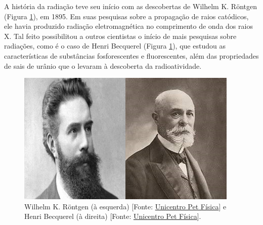 \newcommand{\artigotres}{\begin{center}\textcolor{base}{\MakeUppercase{Tipos de radiações}}\end{center}}


\begin{multicols}{2}


A história da radiação teve seu início com as descobertas de Wilhelm K. Röntgen (Figura \ref{fig:RontgenBecquerel}), em 1895. Em suas pesquisas sobre a propagação de raios catódicos, ele havia produzido radiação eletromagnética no comprimento de onda dos raios X. Tal feito possibilitou a outros cientistas o início de mais pesquisas sobre radiações, como é o caso de Henri Becquerel (Figura \ref{fig:RontgenBecquerel}), que estudou as características de substâncias fosforescentes e fluorescentes, além das propriedades de sais de urânio que o levaram à descoberta da radioatividade.

\begin{figure}[H]
			\centering
			\includegraphics[width=\linewidth]{Figuras/Artigo3/Rontgen_e_Becquerel.png}
			\caption{Wilhelm K. Röntgen (à esquerda) [Fonte: \href{https://www3.unicentro.br/petfisica/2018/03/02/wilhelm-conrad-rontgen-1845-1923/}{Unicentro Pet Física}] e Henri Becquerel (à direita) [Fonte: \href{https://www3.unicentro.br/petfisica/2017/06/22/antoine-henri-becquerel-1852-1908/}{Unicentro Pet Física}].}
			\label{fig:RontgenBecquerel}
\end{figure}


\end{multicols}
